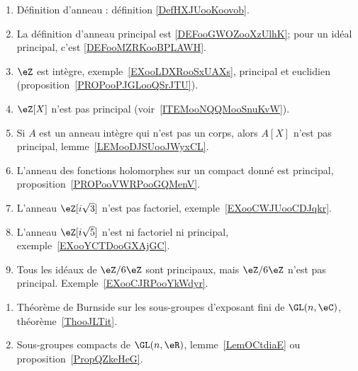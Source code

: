 
\begin{enumerate}
    \item
        Définition d'anneau : définition \ref{DefHXJUooKoovob}.
    \item
        La définition d'anneau principal est \ref{DEFooGWOZooXzUlhK}; pour un idéal principal, c'est \ref{DEFooMZRKooBPLAWH}.
    \item
        \( \eZ\) est intègre, exemple~\ref{EXooLDXRooSxUAXs}, principal et euclidien (proposition~\ref{PROPooPJGLooQSrJTU}).
    \item
        \( \eZ[X]\) n'est pas principal (voir~\ref{ITEMooNQQMooSnuKvW}).
    \item   \label{ITEMooNQQMooSnuKvW}
        Si \( A\) est un anneau intègre qui n'est pas un corps, alors \( A[X]\) n'est pas principal, lemme~\ref{LEMooDJSUooJWyxCL}.
    \item
        L'anneau des fonctions holomorphes sur un compact donné est principal, proposition~\ref{PROPooVWRPooGQMenV}.
    \item
        L'anneau \( \eZ[i\sqrt{ 3 }]\) n'est pas factoriel, exemple~\ref{EXooCWJUooCDJqkr}.
    \item
        L'anneau \( \eZ[i\sqrt{ 5 }]\) n'est ni factoriel ni principal, exemple~\ref{EXooYCTDooGXAjGC}.
    \item
        Tous les idéaux de \( \eZ/6\eZ\) sont principaux, mais \( \eZ/6\eZ\) n'est pas principal. Exemple~\ref{EXooCJRPooYkWdyr}.
\end{enumerate}


\begin{enumerate}
    \item
        Théorème de Burnside sur les sous-groupes d'exposant fini de \( \GL(n,\eC)\), théorème~\ref{ThooJLTit}.
    \item
        Sous-groupes compacts de \( \GL(n,\eR)\), lemme~\ref{LemOCtdiaE} ou proposition~\ref{PropQZkeHeG}.
\end{enumerate}

       \label{THEMEooQEEWooXDhvhv}

